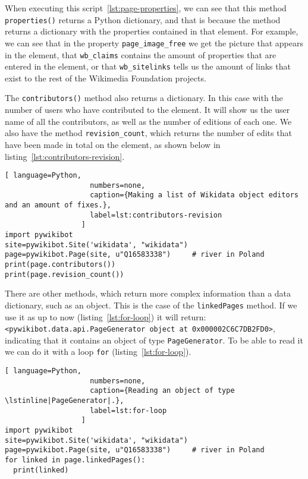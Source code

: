 When executing this script~\ref{lst:page-properties}, 
we can see that this method \lstinline|properties()| 
returns a Python dictionary, and that is because the method returns a dictionary with the properties contained in that element. 
For example, we can see that in the property \lstinline|page_image_free| we get the picture that appears in the element, that
 \lstinline|wb_claims| contains the amount of properties that are entered in the element, 
or that \lstinline|wb_sitelinks| tells us the amount of links that exist to the rest of the Wikimedia Foundation projects.

The \lstinline|contributors()| method also returns a dictionary. In this case with the number of users who have contributed to the element. 
It will show us the user name of all the contributors, as well as the number of editions of each one.
We also have the method \lstinline|revision_count|, which returns the number of edits that have been made in total on the element, as shown below in listing~\ref{lst:contributors-revision}.

\begin{lstlisting}[ language=Python,
                    numbers=none,
                    caption={Making a list of Wikidata object editors and an amount of fixes.},
                    label=lst:contributors-revision
                  ]
import pywikibot
site=pywikibot.Site('wikidata', "wikidata")
page=pywikibot.Page(site, u"Q16583338")     # river in Poland
print(page.contributors())
print(page.revision_count())
\end{lstlisting}

There are other methods, which return more complex information than a data dictionary, such as an object.
This is the case of the \lstinline|linkedPages| method. If we use it as up to now (listing~\ref{lst:for-loop}) it will return: 
\lstinline|<pywikibot.data.api.PageGenerator object at 0x000002C6C7DB2FD0>|, indicating that it contains an object of type \lstinline|PageGenerator|. 
To be able to read it we can do it with a loop \lstinline|for| (listing~\ref{lst:for-loop}).

\begin{lstlisting}[ language=Python,
                    numbers=none,
                    caption={Reading an object of type \lstinline|PageGenerator|.},
                    label=lst:for-loop
                  ]
import pywikibot
site=pywikibot.Site('wikidata', "wikidata")
page=pywikibot.Page(site, u"Q16583338")     # river in Poland
for linked in page.linkedPages():
  print(linked)
\end{lstlisting}

